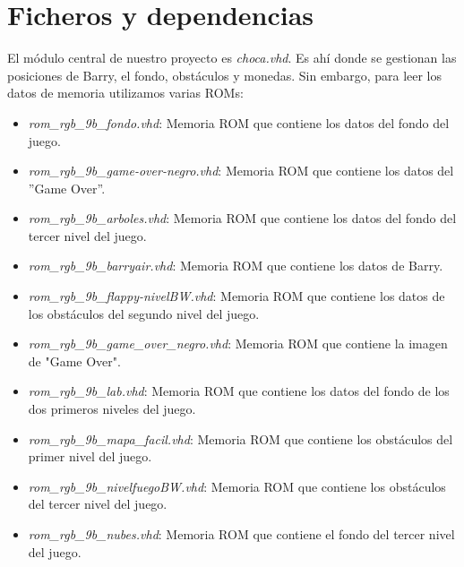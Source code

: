 \documentclass[11pt, a4paper, spanish, openright, twoside]{book}
\begin{document}
\newpage
\mbox{}
\thispagestyle{empty}						%
\newpage


\tableofcontents 							%

\newpage
\mbox{}
\thispagestyle{empty}						%
\newpage


\vspace{3cm}


\section{Ficheros y dependencias}
El módulo central de nuestro proyecto es \textit{choca.vhd}. Es ahí donde se gestionan las posiciones de Barry, el fondo, obstáculos y monedas. Sin embargo, para leer los datos de memoria utilizamos varias ROMs:
\begin{itemize}
\item \textit{rom_rgb_9b_fondo.vhd}: Memoria ROM que contiene los datos del fondo del juego.
\item \textit{rom_rgb_9b_game-over-negro.vhd}: Memoria ROM que contiene los datos del ''Game Over''.
\item \textit{rom_rgb_9b_arboles.vhd}: Memoria ROM que contiene los datos del fondo del tercer nivel del juego.
\item \textit{rom_rgb_9b_barryair.vhd}: Memoria ROM que contiene los datos de Barry.
\item \textit{rom_rgb_9b_flappy-nivelBW.vhd}: Memoria ROM que contiene los datos de los obstáculos del segundo nivel del juego.
\item \textit{rom_rgb_9b_game_over_negro.vhd}: Memoria ROM que contiene la imagen de "Game Over".
\item \textit{rom_rgb_9b_lab.vhd}: Memoria ROM que contiene los datos del fondo de los dos primeros niveles del juego.
\item \textit{rom_rgb_9b_mapa_facil.vhd}: Memoria ROM que contiene los obstáculos del primer nivel del juego.
\item \textit{rom_rgb_9b_nivelfuegoBW.vhd}: Memoria ROM que contiene los obstáculos del tercer nivel del juego.
\item \textit{rom_rgb_9b_nubes.vhd}: Memoria ROM que contiene el fondo del tercer nivel del juego.
\end{itemize}
\end{document}
